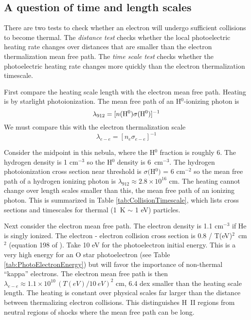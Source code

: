 \documentclass[debug, preprint, twocolumn]{rmaa}
\begin{document}
\subsection{A question of time and length scales}

There are two tests to check whether an electron will undergo sufficient collisions to become thermal.
The \emph{distance test} checks whether the local photoelectric heating rate changes over 
distances that are smaller
than the electron thermalization mean free path.
The \emph{time scale test} checks whether the photoelectric heating rate changes 
more quickly than the electron thermalization timescale.

First compare the heating scale length with the electron mean free path.  
Heating is by starlight photoionization.  
The mean free path of an H$^0$-ionizing photon is
\begin{equation}
\lambda_{912} = [ n({\rm H}^0) \sigma({\rm H}^0) ]^{-1}
\end{equation}
We must compare this with the electron thermalization scale
\begin{equation}
\lambda_{e-e} = [ n_e \sigma_{e-e} ]^{-1}
\end{equation}

Consider the midpoint in this nebula, where the H$^0$ fraction is roughly 6. 
The hydrogen density is 1 cm$^{-3}$ so the H$^0$ density is 6~cm$^{-3}$.  
The hydrogen photoionization cross section near threshold is 
$\sigma($H$^0)$ = 6 cm$^{-2}$ so the mean free path 
of a hydrogen ionizing photon is $\lambda_{912} \approx 2.8\times 10^{16}$ cm.  
The heating cannot change over length scales smaller than this, the mean free path of an ionizing photon.  
This is summarized in Table \ref{tab:CollisionTimescale}, which lists cross sections
and timescales for thermal (1~K $\sim$ 1 eV) particles.

Next consider the electron mean free path.  
The electron density is 1.1 cm$^{-3}$ if He is singly ionized.  
The electron - electron collision cross section is 0.8 / T(eV)$^2$~cm$^2$ 
(equation 198 of \citealt{2005ppfa.book.....K}).  
Take 10 eV for the photoelectron initial energy.  
This is a very high energy for an O star photoelectron (see Table \ref{tab:PhotoElectronEnergy})
but will favor the importance of non-thermal ``kappa'' electrons.  
The electron mean free path is then 
$\lambda_{e-e} \approx 1.1\times 10^{10} \, (T(eV)/10~eV)^2$ cm, 
6.4 dex smaller than the heating scale length.  
The heating is constant over physical scales far larger than the distance between 
thermalizing electron collisions.
This distinguishes  H~II regions from neutral regions of shocks  where
the mean free path can be long.
\end{document}
